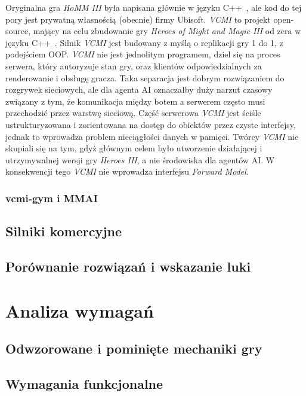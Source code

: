 \documentclass[
    bindingoffset=5mm,
    footnoteindent=3mm,
    hyphenation=true
]{src/wut-thesis}
\begin{document}
Oryginalna gra \emph{HoMM III} była napisana głównie w języku C++~\cite{ICCULUS}, ale kod do tej
pory jest prywatną własnością (obecnie) firmy Ubisoft. \emph{VCMI} to projekt open-source,
mający na celu zbudowanie gry \emph{Heroes of Might and Magic III} od zera w języku C++~\cite{VCMI}.
Silnik \emph{VCMI} jest budowany z myślą o replikacji gry 1 do 1, z podejściem OOP.
\emph{VCMI} nie jest jednolitym programem, dziel się na proces serwera, który autoryzuje stan
gry, oraz klientów odpowiedzialnych za renderowanie i obsługę gracza. Taka separacja
jest dobrym rozwiązaniem do rozgrywek sieciowych, ale dla agenta AI oznaczałby duży
narzut czasowy związany z tym, że komunikacja między botem a serwerem często
musi przechodzić przez warstwę sieciową. Część serwerowa \emph{VCMI} jest ściśle
ustrukturyzowana i zorientowana na dostęp do obiektów przez czyste interfejsy, jednak
to wprowadza problem nieciągłości danych w pamięci. Twórcy \emph{VCMI} nie skupiali się na
tym, gdyż głównym celem było utworzenie działającej i utrzymywalnej wersji gry
\emph{Heroes III}, a nie środowiska dla agentów AI. W konsekwencji tego \emph{VCMI} nie
wprowadza interfejsu \emph{Forward Model}.

\subsubsection{vcmi-gym i MMAI}

\subsection{Silniki komercyjne}

\subsection{Porównanie rozwiązań i wskazanie luki}

\clearpage
\section{Analiza wymagań}

\subsection{Odwzorowane i pominięte mechaniki gry}

\subsection{Wymagania funkcjonalne}
\end{document}
